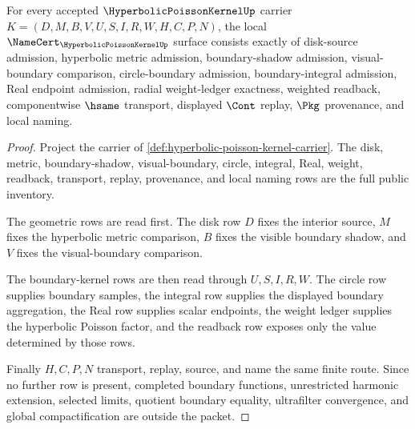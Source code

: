 \begin{theorem}
\label{thm:hyperbolic-poisson-kernel-namecert-obligations}
For every accepted $\HyperbolicPoissonKernelUp$ carrier $K=(D,M,B,V,U,S,I,R,W,H,C,P,N)$, the local $\NameCert_{\HyperbolicPoissonKernelUp}$ surface consists exactly of disk-source admission, hyperbolic metric admission, boundary-shadow admission, visual-boundary comparison, circle-boundary admission, boundary-integral admission, Real endpoint admission, radial weight-ledger exactness, weighted readback, componentwise $\hsame$ transport, displayed $\Cont$ replay, $\Pkg$ provenance, and local naming.
\end{theorem}
\begin{proof}
Project the carrier of \autoref{def:hyperbolic-poisson-kernel-carrier}. The disk, metric, boundary-shadow, visual-boundary, circle, integral, Real, weight, readback, transport, replay, provenance, and local naming rows are the full public inventory.

The geometric rows are read first. The disk row $D$ fixes the interior source, $M$ fixes the hyperbolic metric comparison, $B$ fixes the visible boundary shadow, and $V$ fixes the visual-boundary comparison.

The boundary-kernel rows are then read through $U,S,I,R,W$. The circle row supplies boundary samples, the integral row supplies the displayed boundary aggregation, the Real row supplies scalar endpoints, the weight ledger supplies the hyperbolic Poisson factor, and the readback row exposes only the value determined by those rows.

Finally $H,C,P,N$ transport, replay, source, and name the same finite route. Since no further row is present, completed boundary functions, unrestricted harmonic extension, selected limits, quotient boundary equality, ultrafilter convergence, and global compactification are outside the packet.
\end{proof}

